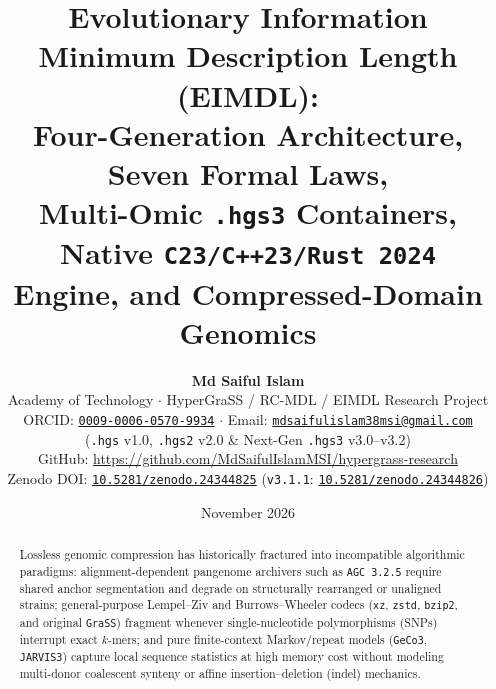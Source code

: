 \documentclass[10pt]{article}
\title{\textbf{Evolutionary Information Minimum Description Length (EIMDL):\\
Four-Generation Architecture, Seven Formal Laws,\\
Multi-Omic \texttt{.hgs3} Containers, Native \texttt{C23/C++23/Rust~2024}\\
Engine, and Compressed-Domain Genomics}}
\author{
  \textbf{Md Saiful Islam}\\
  Academy of Technology $\cdot$ HyperGraSS / RC-MDL / EIMDL Research Project\\
  {\small ORCID: \href{https://orcid.org/0009-0006-0570-9934}{\texttt{0009-0006-0570-9934}} $\cdot$ Email: \href{mailto:mdsaifulislam38msi@gmail.com}{\texttt{mdsaifulislam38msi@gmail.com}}}\\
  (\texttt{.hgs} v1.0, \texttt{.hgs2} v2.0 \& Next-Gen \texttt{.hgs3} v3.0--v3.2)\\
  {\small GitHub: \url{https://github.com/MdSaifulIslamMSI/hypergrass-research}}\\
  {\small Zenodo DOI: \href{https://doi.org/10.5281/zenodo.24344825}{\texttt{10.5281/zenodo.24344825}} (\texttt{v3.1.1}: \href{https://doi.org/10.5281/zenodo.24344826}{\texttt{10.5281/zenodo.24344826}})}
}
\date{November 2026}
\theoremstyle{definition}
\begin{document}
\maketitle

\begin{abstract}
\noindent
Lossless genomic compression has historically fractured into incompatible algorithmic paradigms: alignment-dependent pangenome archivers such as \texttt{AGC~3.2.5} require shared anchor segmentation and degrade on structurally rearranged or unaligned strains; general-purpose Lempel--Ziv and Burrows--Wheeler codecs (\texttt{xz}, \texttt{zstd}, \texttt{bzip2}, and original \texttt{GraSS}) fragment whenever single-nucleotide polymorphisms (SNPs) interrupt exact $k$-mers; and pure finite-context Markov/repeat models (\texttt{GeCo3}, \texttt{JARVIS3}) capture local sequence statistics at high memory cost without modeling multi-donor coalescent synteny or affine insertion--deletion (indel) mechanics.


\end{abstract}
\end{document}
